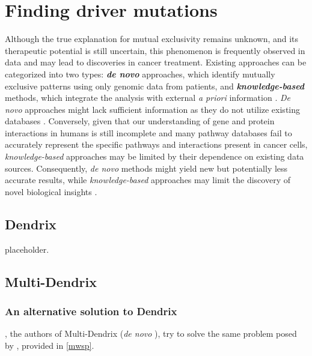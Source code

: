 \chapter{Finding driver mutations} \label{chap:finding_driver_mutations}

Although the true explanation for mutual exclusivity remains unknown, and its therapeutic potential is still uncertain, this phenomenon is frequently observed in data and may lead to discoveries in cancer treatment. Existing approaches can be categorized into two types: \textbf{\textit{de novo}} approaches, which identify mutually exclusive patterns using only genomic data from patients, and \textbf{\textit{knowledge-based}} methods, which integrate the analysis with external \textit{a priori} information \cite{survey}. \textit{De novo} approaches might lack sufficient information as they do not utilize existing databases . Conversely, given that our understanding of gene and protein interactions in humans is still incomplete and many pathway databases fail to accurately represent the specific pathways and interactions present in cancer cells, \textit{knowledge-based} approaches may be limited by their dependence on existing data sources. Consequently, \textit{de novo} methods might yield new but potentially less accurate results, while \textit{knowledge-based} approaches may limit the discovery of novel biological insights \cite{multi-dendrix}.

\section{Dendrix}

placeholder. 

\section{Multi-Dendrix}

\subsection{An alternative solution to Dendrix}

\textcite{multi-dendrix}, the authors of Multi-Dendrix (\textit{de novo} \cite{survey}), try to solve the same problem posed by \textcite{dendrix}, provided in \cref{mwsp}. 

